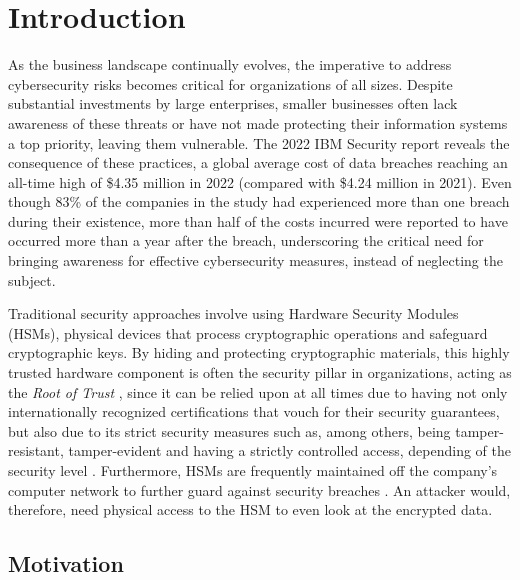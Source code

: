 \chapter{Introduction} \label{chap:introduction}

As the business landscape continually evolves, the imperative to address cybersecurity risks becomes critical for organizations of all sizes. Despite substantial investments by large enterprises, smaller businesses often lack awareness of these threats or have not made protecting their information systems a top priority, leaving them vulnerable. The 2022 IBM Security report \cite{ibmsec2022} reveals the consequence of these practices, a global average cost of data breaches reaching an all-time high of \$4.35 million in 2022 (compared with \$4.24 million in 2021). Even though 83\% of the companies in the study had experienced more than one breach during their existence, more than half of the costs incurred were reported to have occurred more than a year after the breach, underscoring the critical need for bringing awareness for effective cybersecurity measures, instead of neglecting the subject.

Traditional security approaches involve using Hardware Security Modules (HSMs), physical devices that process cryptographic operations and safeguard cryptographic keys. By hiding and protecting cryptographic materials, this highly trusted hardware component is often the security pillar in organizations, acting as the \textit{Root of Trust} \cite{hsmrootoftrust}, since it can be relied upon at all times due to having not only internationally recognized certifications that vouch for their security guarantees, but also due to its strict security measures such as, among others, being tamper-resistant, tamper-evident and having a strictly controlled access, depending of the security level \cite{fipslevels}. Furthermore, HSMs are frequently maintained off the company's computer network to further guard against security breaches \cite{hsmdefinition}. An attacker would, therefore, need physical access to the HSM to even look at the encrypted data. 

\section{Motivation}

